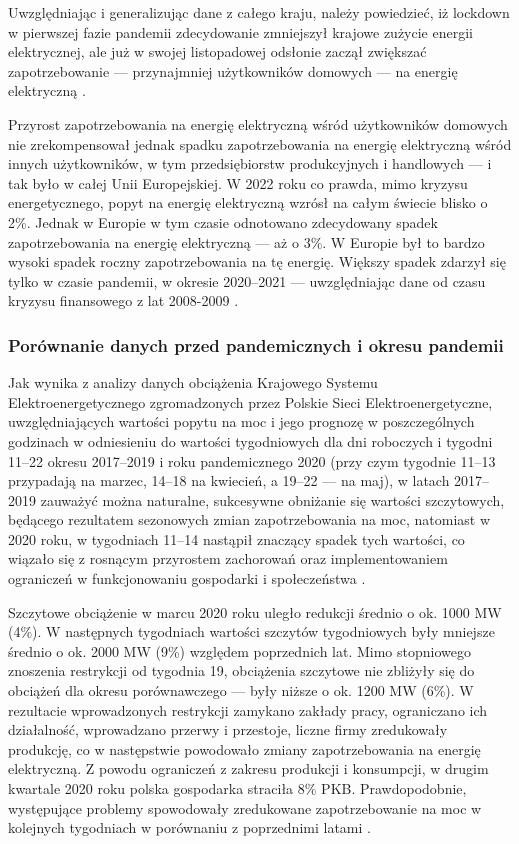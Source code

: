 \documentclass[polish, twoside, 12pt, a4paper]{article}
\theoremstyle{definition}
\theoremstyle{plain}
\theoremstyle{remark}
\begin{document}
Uwzględniając i generalizując dane z całego kraju, należy powiedzieć, iż lockdown w pierwszej fazie pandemii zdecydowanie zmniejszył krajowe zużycie energii elektrycznej, ale już w swojej listopadowej odsłonie zaczął zwiększać zapotrzebowanie --- przynajmniej użytkowników domowych --- na energię elektryczną \citep{kazimierska2023}.

Przyrost zapotrzebowania na energię elektryczną wśród użytkowników domowych nie zrekompensował jednak spadku zapotrzebowania na energię elektryczną wśród innych użytkowników, w tym przedsiębiorstw produkcyjnych i handlowych --- i tak było w całej Unii Europejskiej. W 2022 roku co prawda, mimo kryzysu energetycznego, popyt na energię elektryczną wzrósł na całym świecie blisko o 2\%. Jednak w Europie w tym czasie odnotowano zdecydowany spadek zapotrzebowania na energię elektryczną --- aż o 3\%. W Europie był to bardzo wysoki spadek roczny zapotrzebowania na tę energię. Większy spadek zdarzył się tylko w czasie pandemii, w okresie 2020--2021 --- uwzględniając dane od czasu kryzysu finansowego z lat 2008-2009 \citep{maciuch2023}.  

\subsubsection{Porównanie danych przed pandemicznych i okresu pandemii}

Jak wynika z analizy danych obciążenia Krajowego Systemu Elektroenergetycznego zgromadzonych przez Polskie Sieci Elektroenergetyczne, uwzględniających wartości popytu na moc i jego prognozę w poszczególnych godzinach w odniesieniu do wartości tygodniowych dla dni roboczych i tygodni 11--22 okresu 2017--2019 i roku pandemicznego 2020 (przy czym tygodnie 11--13 przypadają na marzec, 14--18 na kwiecień, a 19--22 --- na maj), w latach 2017--2019 zauważyć można naturalne, sukcesywne obniżanie się wartości szczytowych, będącego rezultatem sezonowych zmian zapotrzebowania na moc, natomiast w 2020 roku, w tygodniach 11--14 nastąpił znaczący spadek tych wartości, co wiązało się z rosnącym przyrostem zachorowań oraz implementowaniem ograniczeń w funkcjonowaniu gospodarki i społeczeństwa \citep{stahl2021}. 

Szczytowe obciążenie w marcu 2020 roku uległo redukcji średnio o ok. 1000 MW (4\%). W następnych tygodniach wartości szczytów tygodniowych były mniejsze średnio o ok. 2000 MW (9\%) względem poprzednich lat. Mimo stopniowego znoszenia restrykcji od tygodnia 19, obciążenia szczytowe nie zbliżyły się do obciążeń dla okresu porównawczego --- były niższe o ok. 1200 MW (6\%). W rezultacie wprowadzonych restrykcji zamykano zakłady pracy, ograniczano ich działalność, wprowadzano przerwy i przestoje, liczne firmy zredukowały produkcję, co w następstwie powodowało zmiany zapotrzebowania na energię elektryczną. Z powodu ograniczeń z zakresu produkcji i konsumpcji, w drugim kwartale 2020 roku polska gospodarka straciła 8\% PKB. Prawdopodobnie, występujące problemy spowodowały zredukowane zapotrzebowanie na moc w kolejnych tygodniach w porównaniu z poprzednimi latami \citep{stahl2021}. 
\end{document}

